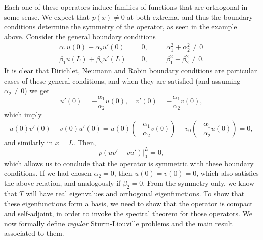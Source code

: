 Each one of these operators induce families of functions that are orthogonal in some sense. We expect that $p(x)\neq 0$ at both extrema, and thus the boundary conditions determine the symmetry of the operator, as seen in the example above. Consider the general boundary conditions 
\begin{equation}
    \begin{aligned}
        \alpha_1 u(0) + \alpha_2 u'(0)&=0, &&\quad\alpha_1^2 + \alpha_2^2 \neq 0\\
        \beta_1 u(L) + \beta_2 u'(L)&=0, &&\quad\beta_1^2 + \beta_2^2 \neq 0.
    \end{aligned}
\end{equation}
It is clear that Dirichlet, Neumann and Robin boundary conditions are particular cases of these general conditions, and when they are satisfied (and assuming $\alpha_2\neq 0$) we get 
\begin{equation*}
    u'(0)=-\frac{\alpha_1}{\alpha_2}u(0), \quad v'(0) = -\frac{\alpha_1}{\alpha_2}v(0),
\end{equation*}
which imply 
\begin{equation*}
    u(0)v'(0)-v(0)u'(0) = u(0) \left(-\frac{\alpha_1}{\alpha_2}v(0)\right) - v_0 \left(-\frac{\alpha_1}{\alpha_2}u(0)\right) = 0,
\end{equation*}
and similarly in $x=L$. Then, 
\begin{equation*}
    \left.p(uv'-vu')\right|_0^L = 0,
\end{equation*}
which allows us to conclude that the operator is symmetric with these boundary conditions. If we had chosen $\alpha_2=0$, then $u(0)=v(0)=0$, which also satisfies the above relation, and analogously if $\beta_2=0$. From the symmetry only, we know that $T$ will have real eigenvalues and orthogonal eigenfunctions. To show that these eigenfunctions form a basis, we need to show that the operator is compact and self-adjoint, in order to invoke the spectral theorem for those operators. We now formally define \emph{regular} Sturm-Liouville problems and the main result associated to them.
